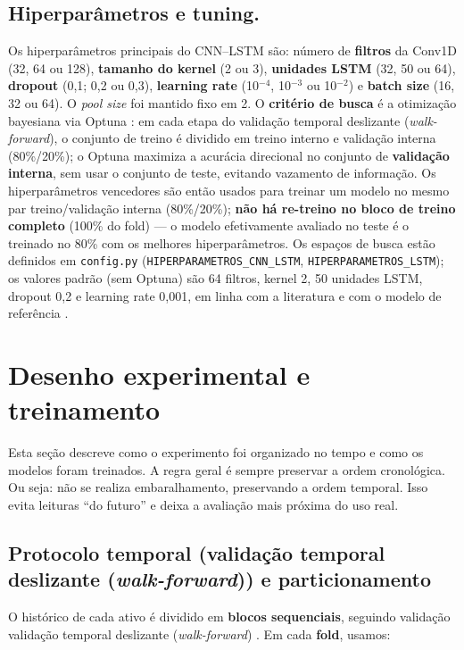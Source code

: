 \subsection{Hiperparâmetros e tuning.} Os hiperparâmetros principais do CNN--LSTM são: número de \textbf{filtros} da Conv1D (32, 64 ou 128), \textbf{tamanho do kernel} (2 ou 3), \textbf{unidades LSTM} (32, 50 ou 64), \textbf{dropout} (0,1; 0,2 ou 0,3), \textbf{learning rate} (10$^{-4}$, 10$^{-3}$ ou 10$^{-2}$) e \textbf{batch size} (16, 32 ou 64). O \emph{pool size} foi mantido fixo em 2. O \textbf{critério de busca} é a otimização bayesiana via Optuna \cite{akiba2019}: em cada etapa do validação temporal deslizante (\textit{walk-forward}), o conjunto de treino é dividido em treino interno e validação interna (80\%/20\%); o Optuna maximiza a acurácia direcional no conjunto de \textbf{validação interna}, sem usar o conjunto de teste, evitando vazamento de informação. Os hiperparâmetros vencedores são então usados para treinar um modelo no mesmo par treino/validação interna (80\%/20\%); \textbf{não há re-treino no bloco de treino completo} (100\% do fold) --- o modelo efetivamente avaliado no teste é o treinado no 80\% com os melhores hiperparâmetros. Os espaços de busca estão definidos em \texttt{config.py} (\texttt{HIPERPARAMETROS\_CNN\_LSTM}, \texttt{HIPERPARAMETROS\_LSTM}); os valores padrão (sem Optuna) são 64 filtros, kernel 2, 50 unidades LSTM, dropout 0,2 e learning rate 0,001, em linha com a literatura e com o modelo de referência \cite{borovykh_2017}.

\section{Desenho experimental e treinamento}

Esta seção descreve como o experimento foi organizado no tempo e como os modelos foram treinados.
A regra geral é sempre preservar a ordem cronológica.
Ou seja: não se realiza embaralhamento, preservando a ordem temporal.
Isso evita leituras “do futuro” e deixa a avaliação mais próxima do uso real.

\subsection{Protocolo temporal (validação temporal deslizante (\textit{walk-forward})) e particionamento}
O histórico de cada ativo é dividido em \textbf{blocos sequenciais}, seguindo validação
validação temporal deslizante (\textit{walk-forward}) \cite{lopezdeprado2018,bergmeir2012}.
Em cada \textbf{fold}, usamos:

